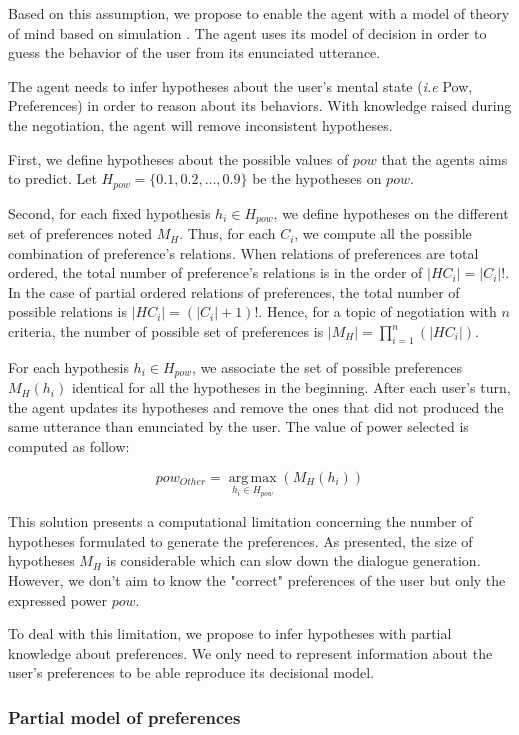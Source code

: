\documentclass{llncs}
\begin{document}
	Based on this assumption, we propose to enable the agent with a model of theory of mind based on simulation \cite{bibid}. The agent uses its model of decision in order to guess the behavior of the user from its enunciated utterance.   
	
	The agent needs to infer hypotheses about the user's mental state (\emph{i.e} Pow, Preferences) in order to reason about its behaviors. With knowledge raised during the negotiation, the agent will remove inconsistent hypotheses.
	
	First, we define hypotheses about the possible values of $pow$ that the agents aims to predict. Let $H_{pow} = \{0.1, 0.2, \ldots, 0.9\}$ be the hypotheses on $pow$.
	
	Second, for each fixed hypothesis $ h_i \in H_{pow}$, we define hypotheses on the different set of preferences  noted $M_H $. Thus, for each $C_i$, we compute all the possible combination of preference's relations. When relations of preferences are total ordered, the total number of preference's relations is in the order of $|H{C_i}| = |C_i|!$. In the case of partial ordered relations of preferences, the total number of possible relations is  $ |H{C_i}| = (|C_i| + 1)!$. Hence, for a topic of negotiation with $n$ criteria, the number of possible set of preferences is $ |M_H| = \prod_{i=1}^n (|H{C_i}|)$. 
	
	For each hypothesis $ h_i \in H_{pow}$, we associate the set of possible preferences $M_H(h_i)$ identical for all the hypotheses in the beginning. After each user's turn, the agent updates its hypotheses and remove the ones that did not produced the same utterance than enunciated by the user. The value of power selected is computed as follow:
	
	\begin{equation}
		pow_{Other} = \operatorname*{arg\,max}_{h_i \in H_{pow}} ( M_H(h_i))
	\end{equation} 
	
	This solution presents a computational limitation concerning the number of hypotheses formulated to generate the preferences. As presented, the size of hypotheses $M_H$ is considerable which can slow down the dialogue generation. However, we don't aim to know the "correct" preferences of the user but only the expressed power $pow$. 
	
	To deal with this limitation, we propose to infer hypotheses with partial knowledge about preferences. We only need to represent information about the user's preferences to be able reproduce its decisional model. 
	
	
	\subsubsection{Partial model of preferences}
	
	
	
	
	
	

	
	
	
	
\end{document}
